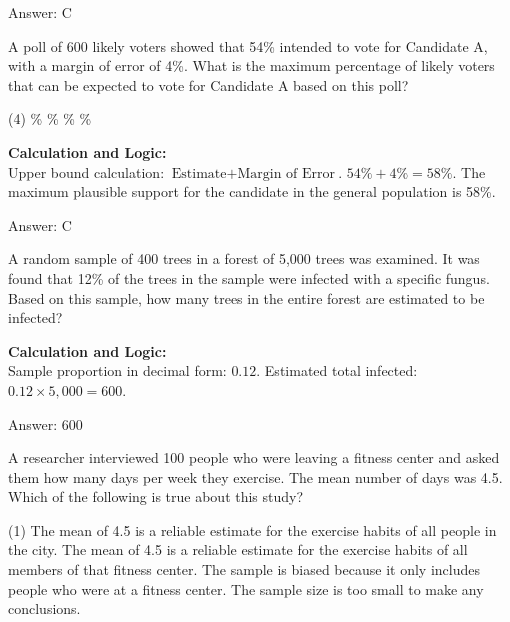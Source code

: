 \documentclass[11pt,paper=a4,answers]{exam}
\begin{document}
\begin{questions}
\begin{solution}
\vspace{30pt}

Answer: \colorbox{yellow!100}{C}
\end{solution}

\vspace{60pt}

\question
A poll of 600 likely voters showed that 54\% intended to vote for Candidate A, with a margin of error of 4\%. What is the maximum percentage of likely voters that can be expected to vote for Candidate A based on this poll?
\begin{tasks}(4)
    \%
    \%
    \%
    \%
\end{tasks}

\begin{solution}
\textbf{Calculation and Logic:} \\
Upper bound calculation: $\text{Estimate} + \text{Margin of Error}$. $54\% + 4\% = 58\%$. The maximum plausible support for the candidate in the general population is 58\%.

\vspace{30pt}

Answer: \colorbox{yellow!100}{C}
\end{solution}

\vspace{60pt}

\question
A random sample of 400 trees in a forest of 5,000 trees was examined. It was found that 12\% of the trees in the sample were infected with a specific fungus. Based on this sample, how many trees in the entire forest are estimated to be infected?

\begin{solution}
\textbf{Calculation and Logic:} \\
Sample proportion in decimal form: $0.12$. Estimated total infected: $0.12 \times 5,000 = 600$.

\vspace{30pt}

Answer: \colorbox{yellow!100}{600}
\end{solution}

\vspace{60pt}

\question
A researcher interviewed 100 people who were leaving a fitness center and asked them how many days per week they exercise. The mean number of days was 4.5. Which of the following is true about this study?
\begin{tasks}(1)
    \task The mean of 4.5 is a reliable estimate for the exercise habits of all people in the city.
    \task The mean of 4.5 is a reliable estimate for the exercise habits of all members of that fitness center.
    \task The sample is biased because it only includes people who were at a fitness center.
    \task The sample size is too small to make any conclusions.
\end{tasks}


\end{questions}
\end{document}
